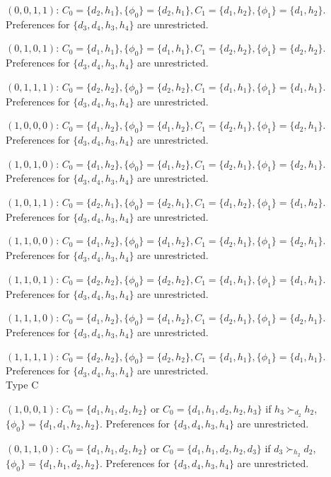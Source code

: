 \documentclass[WP]{AEA}
\begin{document}
$(0,0,1,1)$: $C_0 =\{d_2,h_1\}, \{\phi_0\}=\{d_2,h_1\}, C_1 =\{d_1,h_2\}, \{\phi_1\}=\{d_1,h_2\}$.  Preferences for $\{d_3,d_4,h_3,h_4\}$ are unrestricted.


$(0,1,0,1)$: $C_0 =\{d_1,h_1\}, \{\phi_0\}=\{d_1,h_1\}, C_1 =\{d_2,h_2\}, \{\phi_1\}=\{d_2,h_2\}$.  Preferences for $\{d_3,d_4,h_3,h_4\}$ are unrestricted.


$(0,1,1,1)$: $C_0 =\{d_2,h_2\}, \{\phi_0\}=\{d_2,h_2\}, C_1 =\{d_1,h_1\}, \{\phi_1\}=\{d_1,h_1\}$.  Preferences for $\{d_3,d_4,h_3,h_4\}$ are unrestricted.


$(1,0,0,0)$: $C_0 =\{d_1,h_2\}, \{\phi_0\}=\{d_1,h_2\}, C_1 =\{d_2,h_1\}, \{\phi_1\}=\{d_2,h_1\}$.  Preferences for $\{d_3,d_4,h_3,h_4\}$ are unrestricted.


$(1,0,1,0)$: $C_0 =\{d_1,h_2\}, \{\phi_0\}=\{d_1,h_2\}, C_1 =\{d_2,h_1\}, \{\phi_1\}=\{d_2,h_1\}$.  Preferences for $\{d_3,d_4,h_3,h_4\}$ are unrestricted.


$(1,0,1,1)$: $C_0 =\{d_2,h_1\}, \{\phi_0\}=\{d_2,h_1\}, C_1 =\{d_1,h_2\}, \{\phi_1\}=\{d_1,h_2\}$.  Preferences for $\{d_3,d_4,h_3,h_4\}$ are unrestricted.



$(1,1,0,0)$:  $C_0 =\{d_1,h_2\}, \{\phi_0\}=\{d_1,h_2\}, C_1 =\{d_2,h_1\}, \{\phi_1\}=\{d_2,h_1\}$.  Preferences for $\{d_3,d_4,h_3,h_4\}$ are unrestricted.


$(1,1,0,1)$:  $C_0 =\{d_2,h_2\}, \{\phi_0\}=\{d_2,h_2\}, C_1 =\{d_1,h_1\}, \{\phi_1\}=\{d_1,h_1\}$.  Preferences for $\{d_3,d_4,h_3,h_4\}$ are unrestricted.



$(1,1,1,0)$:  $C_0 =\{d_1,h_2\}, \{\phi_0\}=\{d_1,h_2\}, C_1 =\{d_2,h_1\}, \{\phi_1\}=\{d_2,h_1\}$.  Preferences for $\{d_3,d_4,h_3,h_4\}$ are unrestricted.



$(1,1,1,1)$:  $C_0 =\{d_2,h_2\}, \{\phi_0\}=\{d_2,h_2\}, C_1 =\{d_1,h_1\}, \{\phi_1\}=\{d_1,h_1\}$.  Preferences for $\{d_3,d_4,h_3,h_4\}$ are unrestricted.
\\

Type C

$(1,0,0,1)$:  $C_0 =\{d_1,h_1,d_2,h_2\}$ or $C_0 =\{d_1,h_1,d_2,h_2, h_3\}$ if $h_3\succ_{d_2} h_2$, $\{\phi_0\}=\{d_1,d_1,h_2,h_2\}$.  Preferences for $\{d_3,d_4,h_3,h_4\}$ are unrestricted. 

$(0,1,1,0)$:  $C_0 =\{d_1,h_1,d_2,h_2\}$ or $C_0 =\{d_1,h_1,d_2,h_2, d_3\}$ if $d_3\succ_{h_2} d_2$, $\{\phi_0\}=\{d_1,h_1,d_2,h_2\}$.  Preferences for $\{d_3,d_4,h_3,h_4\}$ are unrestricted. 
\\
\end{document}
